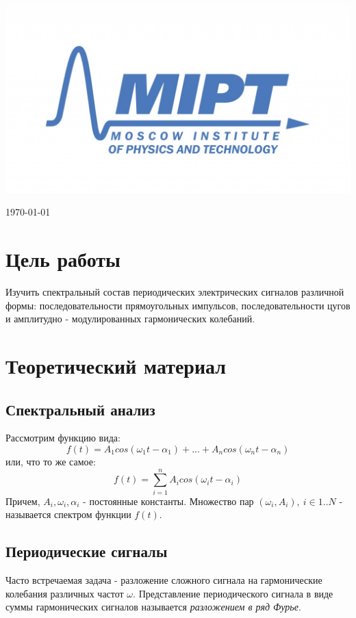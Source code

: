 \documentclass[a4paper, 12pt]{article}
\newenvironment{bottompar}{\par\vspace*{\fill}}{\clearpage}
\begin{document}
\begin{titlepage}
\begin{bottompar}
	\begin{center}
		\includegraphics[width = 80 mm]{logo.jpg}
	\end{center}
	{\large \today}

\end{bottompar}
\vfill %

\end{titlepage}

\section{Цель работы}

Изучить спектральный состав периодических электрических сигналов различной формы: последовательности прямоугольных импульсов, последовательности цугов и амплитудно - модулированных гармонических колебаний.

\section{Теоретический материал}

\subsection{Спектральный анализ}

Рассмотрим функцию вида:
$$f(t) = A_{1}cos(\omega_1t-\alpha_{1}) + ... + A_{n}cos(\omega_{n}t-\alpha_{n})$$
или, что то же самое:
$$f(t) = \sum\limits_{i=1}^n A_{i}cos(\omega_{i}t-\alpha_{i})$$
Причем, $A_{i}, \omega_{i}, \alpha_{i}$ - постоянные константы. Множество пар $(\omega_{i}, A_{i}), \: i \in 1..N$ - называется спектром функции $f(t)$.

\subsection{Периодические сигналы}

Часто встречаемая задача - разложение сложного сигнала на гармонические колебания различных частот $\omega$. Представление периодического сигнала в виде суммы гармонических сигналов называется {\it{разложением в ряд Фурье}}.
\end{document}
